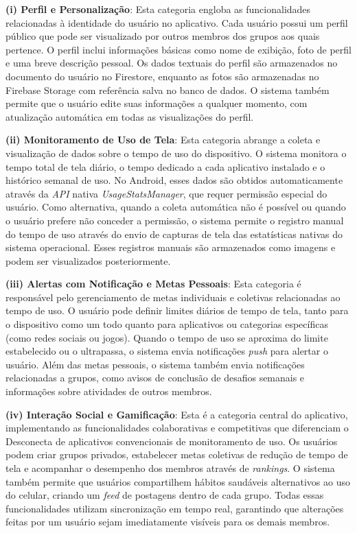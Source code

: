 \textbf{(i) Perfil e Personalização}: Esta categoria engloba as funcionalidades relacionadas à identidade do usuário no aplicativo. Cada usuário possui um perfil público que pode ser visualizado por outros membros dos grupos aos quais pertence. O perfil inclui informações básicas como nome de exibição, foto de perfil e uma breve descrição pessoal. Os dados textuais do perfil são armazenados no documento do usuário no Firestore, enquanto as fotos são armazenadas no Firebase Storage com referência salva no banco de dados. O sistema também permite que o usuário edite suas informações a qualquer momento, com atualização automática em todas as visualizações do perfil.

\textbf{(ii) Monitoramento de Uso de Tela}: Esta categoria abrange a coleta e visualização de dados sobre o tempo de uso do dispositivo. O sistema monitora o tempo total de tela diário, o tempo dedicado a cada aplicativo instalado e o histórico semanal de uso. No Android, esses dados são obtidos automaticamente através da \textit{API} nativa \textit{UsageStatsManager}, que requer permissão especial do usuário. Como alternativa, quando a coleta automática não é possível ou quando o usuário prefere não conceder a permissão, o sistema permite o registro manual do tempo de uso através do envio de capturas de tela das estatísticas nativas do sistema operacional. Esses registros manuais são armazenados como imagens e podem ser visualizados posteriormente.

\textbf{(iii) Alertas com Notificação e Metas Pessoais}: Esta categoria é responsável pelo gerenciamento de metas individuais e coletivas relacionadas ao tempo de uso. O usuário pode definir limites diários de tempo de tela, tanto para o dispositivo como um todo quanto para aplicativos ou categorias específicas (como redes sociais ou jogos). Quando o tempo de uso se aproxima do limite estabelecido ou o ultrapassa, o sistema envia notificações \textit{push} para alertar o usuário. Além das metas pessoais, o sistema também envia notificações relacionadas a grupos, como avisos de conclusão de desafios semanais e informações sobre atividades de outros membros.

\textbf{(iv) Interação Social e Gamificação}: Esta é a categoria central do aplicativo, implementando as funcionalidades colaborativas e competitivas que diferenciam o Des\-co\-nec\-ta de aplicativos convencionais de monitoramento de uso. Os usuários podem criar grupos privados, estabelecer metas coletivas de redução de tempo de tela e acompanhar o desempenho dos membros através de \textit{rankings}. O sistema também permite que usuários compartilhem hábitos saudáveis alternativos ao uso do celular, criando um \textit{feed} de postagens dentro de cada grupo. Todas essas funcionalidades utilizam sincronização em tempo real, garantindo que alterações feitas por um usuário sejam imediatamente visíveis para os demais membros.

